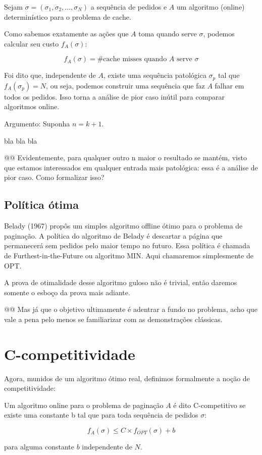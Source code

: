 \documentclass[a4paper,oneside,reqno,12pt]{amsart}
\begin{document}
Sejam $\sigma = (\sigma_1, \sigma_2, ... , \sigma_N)$ a sequência de pedidos e $A$ um algoritmo (online) determinístico para o problema de cache.

Como sabemos exatamente as ações que $A$ toma quando serve $\sigma$, podemos calcular seu custo $f_A(\sigma)$:

\[f_A(\sigma) = \text{\# cache misses quando $A$ serve } \sigma\]

Foi dito que, independente de $A$, existe uma sequência patológica $\sigma_p$ tal que $f_A(\sigma_p) = N$, ou seja, podemos construir uma sequência que faz $A$ falhar em todos os pedidos. Isso torna a análise de pior caso inútil para comparar algoritmos online.

Argumento: Suponha $n  = k + 1$.

bla bla bla

@@ Evidentemente, para qualquer outro n maior o resultado se mantém, visto que estamos interessados em qualquer entrada mais patológica: essa é a análise de pior caso. Como formalizar isso?

\subsection{Política ótima}

Belady (1967) propôs um simples algoritmo offline ótimo para o problema de paginação. A política do algoritmo de Belady é descartar a página que permanecerá sem pedidos pelo maior tempo no futuro. Essa política é chamada de Furthest-in-the-Future ou algoritmo MIN. Aqui chamaremos simplesmente de OPT.

A prova de otimalidade desse algoritmo guloso não é trivial, então daremos somente o esboço da prova mais adiante.

@@ Mas já que o objetivo ultimamente é adentrar a fundo no problema, acho que vale a pena pelo menos se familiarizar com as demonstrações clássicas.

\section{C-competitividade}

Agora, munidos de um algoritmo ótimo real, definimos formalmente a noção de competitividade:

\begin{definition}
Um algoritmo online para o problema de paginação $A$ é dito C-competitivo se existe uma constante b tal que para toda sequência de pedidos $\sigma$:

\[f_A(\sigma) \leqslant C \times f_{OPT}(\sigma) + b\]

para alguma constante $b$ independente de $N$.
\end{definition}
\end{document}
